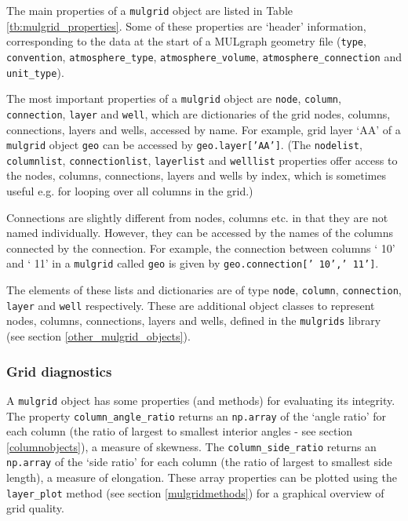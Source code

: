 The main properties of a \texttt{mulgrid} object are listed in Table \ref{tb:mulgrid_properties}.  Some of these properties are `header' information, corresponding to the data at the start of a MULgraph geometry file (\texttt{type}, \texttt{convention}, \texttt{atmosphere\_type}, \texttt{atmosphere\_volume}, \texttt{atmosphere\_connection} and \texttt{unit\_type}).

The most important properties of a \texttt{mulgrid} object are \texttt{node}, \texttt{column}, \texttt{connection}, \texttt{layer} and \texttt{well}, which are dictionaries of the grid nodes, columns, connections, layers and wells, accessed by name.  For example, grid layer `AA' of a \texttt{mulgrid} object \texttt{geo} can be accessed by \texttt{geo.layer['AA']}.  (The \texttt{nodelist}, \texttt{columnlist}, \texttt{connectionlist}, \texttt{layerlist} and \texttt{welllist} properties offer access to the nodes, columns, connections, layers and wells by index, which is sometimes useful e.g. for looping over all columns in the grid.)

Connections are slightly different from nodes, columns etc. in that they are not named individually.  However, they can be accessed by the names of the columns connected by the connection.  For example, the connection between columns ` 10' and ` 11' in a \texttt{mulgrid} called \texttt{geo} is given by \texttt{geo.connection[' 10',' 11']}.

The elements of these lists and dictionaries are of type \texttt{node}, \texttt{column}, \texttt{connection}, \texttt{layer} and \texttt{well} respectively.  These are additional object classes to represent nodes, columns, connections, layers and wells, defined in the \texttt{mulgrids} library (see section \ref{other_mulgrid_objects}).

\subsubsection{Grid diagnostics}

A \texttt{mulgrid} object has some properties (and methods) for evaluating its integrity.  The property \texttt{column\_angle\_ratio} returns an \texttt{np.array} of the `angle ratio' for each column (the ratio of largest to smallest interior angles - see section \ref{columnobjects}), a measure of skewness.  The \texttt{column\_side\_ratio} returns an \texttt{np.array} of the `side ratio' for each column (the ratio of largest to smallest side length), a measure of elongation.  These array properties can be plotted using the \texttt{layer\_plot} method (see section \ref{mulgridmethods}) for a graphical overview of grid quality.

